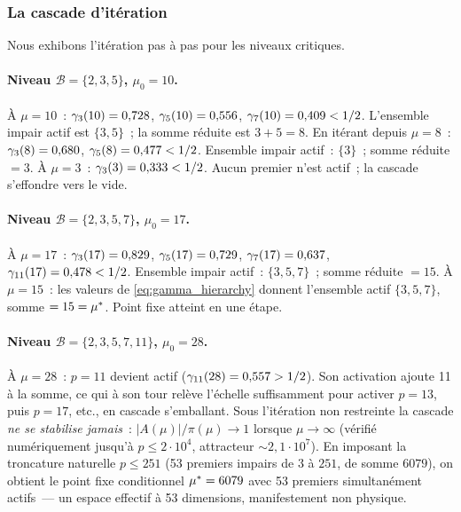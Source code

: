 \documentclass[12pt,a4paper]{article}
\begin{document}
\subsubsection{La cascade d'itération}

Nous exhibons l'itération pas à pas pour les niveaux critiques.

\paragraph{Niveau $\mathcal{B} = \{2,3,5\}$, $\mu_0 = 10$.}
À $\mu = 10$~:
$\gamma_{3}(10) = 0{,}728$, $\gamma_{5}(10) = 0{,}556$,
$\gamma_{7}(10) = 0{,}409 < 1/2$.
L'ensemble impair actif est $\{3,5\}$~; la somme réduite est
$3 + 5 = 8$. En itérant depuis $\mu = 8$~:
$\gamma_{3}(8) = 0{,}680$, $\gamma_{5}(8) = 0{,}477 < 1/2$.
Ensemble impair actif~: $\{3\}$~; somme réduite $= 3$.
À $\mu = 3$~: $\gamma_{3}(3) = 0{,}333 < 1/2$.
Aucun premier n'est actif~; la cascade s'effondre vers le vide.

\paragraph{Niveau $\mathcal{B} = \{2,3,5,7\}$, $\mu_0 = 17$.}
À $\mu = 17$~:
$\gamma_{3}(17) = 0{,}829$, $\gamma_{5}(17) = 0{,}729$,
$\gamma_{7}(17) = 0{,}637$, $\gamma_{11}(17) = 0{,}478 < 1/2$.
Ensemble impair actif~: $\{3,5,7\}$~; somme réduite $= 15$.
À $\mu = 15$~: les valeurs de \eqref{eq:gamma_hierarchy} donnent
l'ensemble actif $\{3,5,7\}$, somme $= 15 = {\mu^{*}}$. Point fixe
atteint en une étape.

\paragraph{Niveau $\mathcal{B} = \{2,3,5,7,11\}$, $\mu_0 = 28$.}
À $\mu = 28$~: $p = 11$ devient actif ($\gamma_{11}(28) = 0{,}557 > 1/2$).
Son activation ajoute 11 à la somme, ce qui à son tour relève
l'échelle suffisamment pour activer $p = 13$, puis $p = 17$, etc.,
en cascade s'emballant. Sous l'itération non restreinte la cascade
\emph{ne se stabilise jamais}~: $|A(\mu)|/\pi(\mu) \to 1$ lorsque
$\mu \to \infty$ (vérifié numériquement jusqu'à $p \leq 2 \cdot 10^4$,
attracteur $\sim 2{,}1 \cdot 10^7$). En imposant la troncature
naturelle $p \leq 251$ (53 premiers impairs de $3$ à $251$, de somme
$6079$), on obtient le point fixe conditionnel ${\mu^{*}} = 6079$ avec
53 premiers simultanément actifs~--- un espace effectif à 53
dimensions, manifestement non physique.
\end{document}
